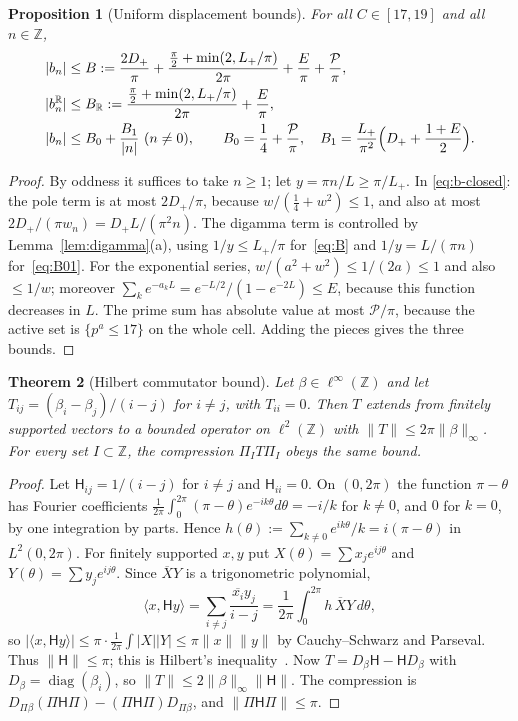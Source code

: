 \documentclass[11pt,a4paper]{article}
\newtheorem{theorem}{Theorem}[section]
\newtheorem{proposition}[theorem]{Proposition}
\theoremstyle{definition}
\newcommand{\Z}{\mathbb{Z}}
\newcommand{\R}{\mathbb{R}}
\newcommand{\ip}[2]{\langle #1,#2\rangle}
\newcommand{\norm}[1]{\lVert #1\rVert}
\newcommand{\abs}[1]{\lvert #1\rvert}
\newcommand{\Lmax}{L_{+}}
\DeclareMathOperator{\diag}{diag}
\begin{document}
\begin{proposition}[Uniform displacement bounds]\label{prop:b-bounds}
For all $C\in[17,19]$ and all $n\in\Z$,
\begin{align}
\abs{b_n}&\le B:=\frac{2D_{+}}\pi+\frac{\frac\pi2+\min(2,\Lmax/\pi)}{2\pi}+\frac E\pi+\frac{\mathcal P}\pi,\label{eq:B}\\
\abs{b^\R_n}&\le B_\R:=\frac{\frac\pi2+\min(2,\Lmax/\pi)}{2\pi}+\frac E\pi,\label{eq:BR}\\
\abs{b_n}&\le B_0+\frac{B_1}{\abs n}\ (n\ne0),\qquad B_0=\frac14+\frac{\mathcal P}\pi,\quad B_1=\frac{\Lmax}{\pi^2}\Bigl(D_{+}+\frac{1+E}2\Bigr).\label{eq:B01}
\end{align}
\end{proposition}

\begin{proof}
By oddness it suffices to take $n\ge1$; let $y=\pi n/L\ge\pi/\Lmax$. In
\eqref{eq:b-closed}: the pole term is at most $2D_{+}/\pi$, because
$w/(\frac14+w^2)\le1$, and also at most $2D_{+}/(\pi w_n)=D_{+}L/(\pi^2n)$.
The digamma term is controlled by Lemma~\ref{lem:digamma}(a), using
$1/y\le\Lmax/\pi$ for~\eqref{eq:B} and $1/y=L/(\pi n)$ for~\eqref{eq:B01}.
For the exponential series, $w/(a^2+w^2)\le1/(2a)\le1$ and also
$\le1/w$; moreover $\sum_ke^{-a_kL}=e^{-L/2}/(1-e^{-2L})\le E$, because this
function decreases in $L$. The prime sum has absolute value at most
$\mathcal P/\pi$, because the active set is $\{p^a\le17\}$ on the whole
cell. Adding the pieces gives the three bounds.
\end{proof}

\begin{theorem}[Hilbert commutator bound]\label{thm:hilbert}
Let $\beta\in\ell^\infty(\Z)$ and let $T_{ij}=(\beta_i-\beta_j)/(i-j)$ for
$i\ne j$, with $T_{ii}=0$. Then $T$ extends from finitely supported vectors
to a bounded operator on $\ell^2(\Z)$ with
$\norm T\le2\pi\norm\beta_\infty$. For every set $I\subset\Z$, the
compression $\Pi_IT\Pi_I$ obeys the same bound.
\end{theorem}

\begin{proof}
Let $\mathsf H_{ij}=1/(i-j)$ for $i\ne j$ and $\mathsf H_{ii}=0$. On
$(0,2\pi)$ the function $\pi-\theta$ has Fourier coefficients
$\frac1{2\pi}\int_0^{2\pi}(\pi-\theta)e^{-ik\theta}d\theta=-i/k$ for $k\ne0$,
and $0$ for $k=0$, by one integration by parts. Hence
$h(\theta):=\sum_{k\ne0}e^{ik\theta}/k=i(\pi-\theta)$ in $L^2(0,2\pi)$. For
finitely supported $x,y$ put $X(\theta)=\sum x_je^{ij\theta}$ and
$Y(\theta)=\sum y_je^{ij\theta}$. Since $\overline XY$ is a trigonometric
polynomial,
\[
\ip x{\mathsf Hy}=\sum_{i\ne j}\frac{\overline{x_i}y_j}{i-j}=\frac1{2\pi}\int_0^{2\pi}h\,\overline XY\,d\theta,
\]
so $\abs{\ip x{\mathsf Hy}}\le\pi\cdot\frac1{2\pi}\int\abs X\abs Y\le\pi\norm x\norm y$
by Cauchy--Schwarz and Parseval. Thus $\norm{\mathsf H}\le\pi$; this is Hilbert's inequality~\cite[Ch.~IX]{HLP}. Now
$T=D_\beta\mathsf H-\mathsf HD_\beta$ with $D_\beta=\diag(\beta_i)$, so
$\norm T\le2\norm\beta_\infty\norm{\mathsf H}$. The compression is
$D_{\Pi\beta}(\Pi\mathsf H\Pi)-(\Pi\mathsf H\Pi)D_{\Pi\beta}$, and
$\norm{\Pi\mathsf H\Pi}\le\pi$.
\end{proof}
\end{document}

